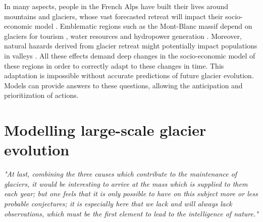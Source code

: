 In many aspects, people in the French Alps have built their lives around mountains and glaciers, whose vast forecasted retreat will impact their socio-economic model \citep{mourey_evolution_2017, spandre_winter_2019}. Emblematic regions such as the Mont-Blanc massif depend on glaciers for tourism \citep{schut_sport_2013, spandre_climate_2019}, water resources and hydropower generation  \citep{laurent_impact_2020}. Moreover, natural hazards derived from glacier retreat might potentially impact populations in valleys \citep{magnin_estimating_2020}. All these effects demand deep changes in the socio-economic model of these regions in order to correctly adapt to these changes in time. This adaptation is impossible without accurate predictions of future glacier evolution. Models can provide answers to these questions, allowing the anticipation and prioritization of actions.

\section{Modelling large-scale glacier evolution}

\emph{"At last, combining the three causes which contribute to the maintenance of glaciers, it would be interesting to arrive at the mass which is supplied to them each year; but one feels that it is only possible to have on this subject more or less probable conjectures; it is especially here that we lack and will always lack observations, which must be the first element to lead to the intelligence of nature."}

